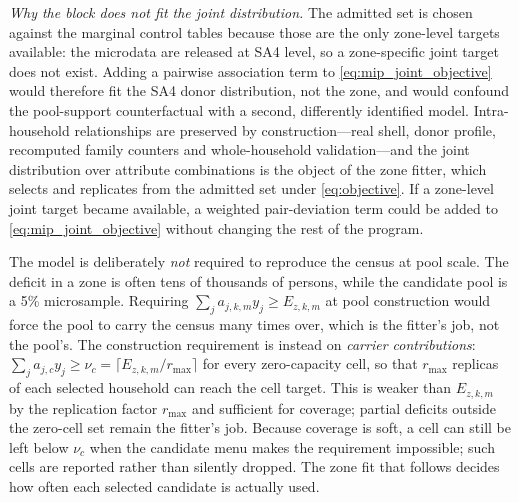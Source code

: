 \emph{Why the block does not fit the joint distribution.} The admitted set is
chosen against the marginal control tables because those are the only
zone-level targets available: the microdata are released at SA4 level, so a
zone-specific joint target does not exist. Adding a pairwise association term to
\eqref{eq:mip_joint_objective} would therefore fit the SA4 donor distribution,
not the zone, and would confound the pool-support counterfactual with a second,
differently identified model. Intra-household relationships are preserved by
construction---real shell, donor profile, recomputed family counters and
whole-household validation---and the joint distribution over attribute
combinations is the object of the zone fitter, which selects and replicates from
the admitted set under \eqref{eq:objective}. If a zone-level joint target became
available, a weighted pair-deviation term could be added to
\eqref{eq:mip_joint_objective} without changing the rest of the program.

The model is deliberately \emph{not} required to reproduce the census at pool
scale. The deficit in a zone is often tens of thousands of persons, while the
candidate pool is a 5\% microsample. Requiring
$\sum_j a_{j,k,m}y_j\ge E_{z,k,m}$ at pool construction would force the pool to
carry the census many times over, which is the fitter's job, not the pool's.
The construction requirement is instead on \emph{carrier contributions}:
$\sum_j a_{j,c}y_j\ge \nu_c=\lceil E_{z,k,m}/r_{\max}\rceil$ for every
zero-capacity cell, so that $r_{\max}$ replicas of each selected household can
reach the cell target. This is weaker than $E_{z,k,m}$ by the replication
factor $r_{\max}$ and sufficient for coverage; partial deficits outside the
zero-cell set remain the fitter's job. Because coverage is soft, a cell can
still be left below $\nu_c$ when the candidate menu makes the requirement
impossible; such cells are reported rather than silently dropped. The zone fit
that follows decides how often each selected candidate is actually used.
